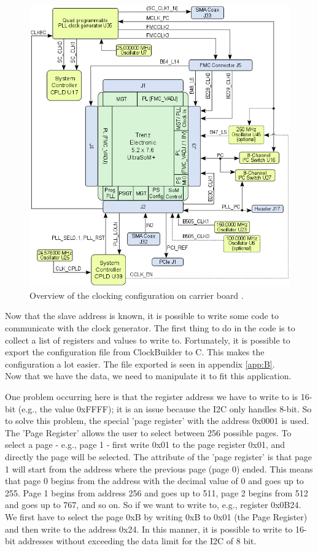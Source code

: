\begin{figure}[H]
    \centering
    \includegraphics[width=.85\textwidth]{Graphics/BD-TEBF0808_Clocking.png}
    \caption{Overview of the clocking configuration on carrier board .}
    \label{fig:overview}
\end{figure}

\noindent Now that the slave address is known, it is possible to write some code to communicate with the clock generator. The first thing to do in the code is to collect a list of registers and values to write to. Fortunately, it is possible to export the configuration file from ClockBuilder to C. This makes the configuration a lot easier. The file exported is seen in appendix \ref{app:B}.\\

\noindent Now that we have the data, we need to manipulate it to fit this application. 

One problem occurring here is that the register address we have to write to is 16-bit (e.g., the value 0xFFFF); it is an issue because the I2C only handles 8-bit. So to solve this problem, the special 'page register' with the address 0x0001 is used. The 'Page Register' allows the user to select between 256 possible pages. To select a page - e.g., page 1 - first write 0x01 to the page register 0x01, and directly the page will be selected. The attribute of the 'page register' is that page 1 will start from the address where the previous page (page 0) ended. This means that page 0 begins from the address with the decimal value of 0 and goes up to 255. Page 1 begins from address 256 and goes up to 511,  page 2 begins from 512 and goes up to 767, and so on. So if we want to write to, e.g., register 0x0B24. We first have to select the page 0xB by writing 0xB to 0x01 (the Page Register) and then write to the address 0x24. In this manner, it is possible to write to 16-bit addresses without exceeding the data limit for the I2C of 8 bit.\\

